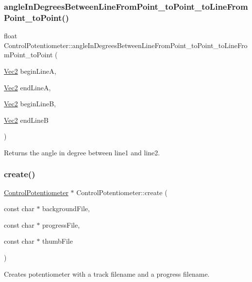 \subsubsection{\texorpdfstring{angle\+In\+Degrees\+Between\+Line\+From\+Point\+\_\+to\+Point\+\_\+to\+Line\+From\+Point\+\_\+to\+Point()}{angleInDegreesBetweenLineFromPoint\_toPoint\_toLineFromPoint\_toPoint()}\hspace{0.1cm}{\footnotesize\ttfamily [2/2]}}
{\footnotesize\ttfamily float Control\+Potentiometer\+::angle\+In\+Degrees\+Between\+Line\+From\+Point\+\_\+to\+Point\+\_\+to\+Line\+From\+Point\+\_\+to\+Point (\begin{DoxyParamCaption}\item[{\hyperlink{classVec2}{Vec2}}]{begin\+LineA,  }\item[{\hyperlink{classVec2}{Vec2}}]{end\+LineA,  }\item[{\hyperlink{classVec2}{Vec2}}]{begin\+LineB,  }\item[{\hyperlink{classVec2}{Vec2}}]{end\+LineB }\end{DoxyParamCaption})}

Returns the angle in degree between line1 and line2. \mbox{\label{classControlPotentiometer_a8abc77decaf67e3766d9ed6bf27b264d}} 
\subsubsection{\texorpdfstring{create()}{create()}\hspace{0.1cm}{\footnotesize\ttfamily [1/2]}}
{\footnotesize\ttfamily \hyperlink{classControlPotentiometer}{Control\+Potentiometer} $\ast$ Control\+Potentiometer\+::create (\begin{DoxyParamCaption}\item[{const char $\ast$}]{background\+File,  }\item[{const char $\ast$}]{progress\+File,  }\item[{const char $\ast$}]{thumb\+File }\end{DoxyParamCaption})\hspace{0.3cm}{\ttfamily [static]}}

Creates potentiometer with a track filename and a progress filename. \mbox{\label{classControlPotentiometer_a32512b74b8516e0fbe8b7e9f9adfab33}} 
